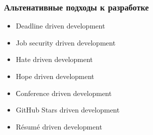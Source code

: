 \documentclass{../../slides-style}
\begin{document}
    \begin{frame}
        \frametitle{Альтенативные подходы к разработке}
        \begin{itemize}
            \item Deadline driven development
            \item Job security driven development
            \item Hate driven development
            \item Hope driven development
            \item Сonference driven development
            \item GitHub Stars driven development
            \item Résumé driven development
        \end{itemize}
    \end{frame}
\end{document}
